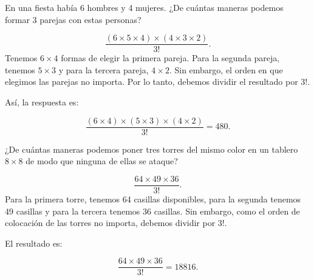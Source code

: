 \documentclass[11pt]{scrartcl}
\begin{document}
\begin{problem}
En una fiesta había 6 hombres y 4 mujeres. ¿De cuántas maneras podemos formar 3 parejas con estas personas?
\begin{hint}
\[ \frac{(6 \times 5 \times 4) \times (4 \times 3 \times 2)}{3!}.\]
Tenemos $6 \times 4$ formas de elegir la primera pareja. Para la segunda pareja, tenemos $5 \times 3$ y para la tercera pareja, $4 \times 2$. Sin embargo, el orden en que elegimos las parejas no importa. Por lo tanto, debemos dividir el resultado por $3!$.

Así, la respuesta es:

$$
\frac{(6 \times 4) \times (5 \times 3) \times (4 \times 2)}{3!} = 480.
$$
\end{hint}
\end{problem}

\begin{problem}
¿De cuántas maneras podemos poner tres torres del mismo color en un tablero \(8 \times 8\) de modo que ninguna de ellas se ataque?
\begin{hint}
\[\frac{64 \times 49 \times 36}{3!}.\]
Para la primera torre, tenemos 64 casillas disponibles, para la segunda tenemos 49 casillas y para la tercera tenemos 36 casillas. Sin embargo, como el orden de colocación de las torres no importa, debemos dividir por $3!$.

El resultado es:

$$
\frac{64 \times 49 \times 36}{3!} = 18816.
$$
\end{hint}
\end{problem}
\end{document}
